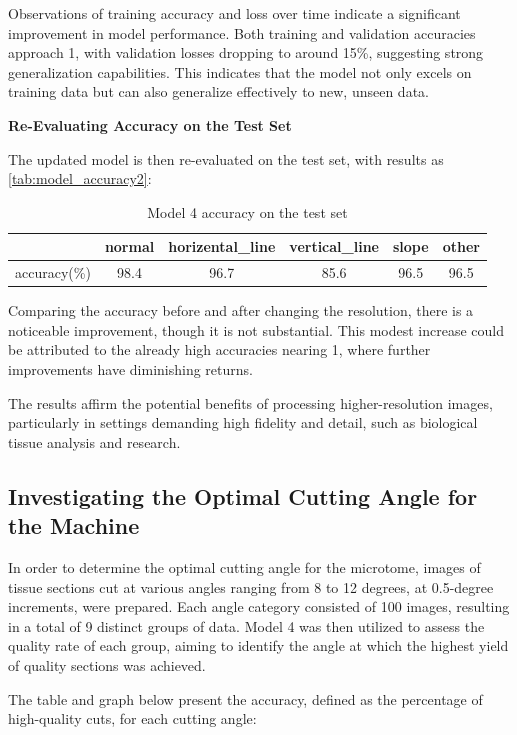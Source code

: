Observations of training accuracy and loss over time indicate a significant improvement in model performance. Both training and validation accuracies approach 1, with validation losses dropping to around 15\%, suggesting strong generalization capabilities. This indicates that the model not only excels on training data but can also generalize effectively to new, unseen data.

\textbf{Re-Evaluating Accuracy on the Test Set}

The updated model is then re-evaluated on the test set, with results as \autoref{tab:model_accuracy2}:

\begin{table}
    \centering
    \caption{Model 4 accuracy on the test set}
    \begin{tabular}{cccccc}
        \toprule
        & normal & horizental\_line & vertical\_line & slope & other \\
        \midrule
        accuracy(\%) & 98.4 & 96.7 & 85.6 & 96.5 & 96.5 \\
        \bottomrule
    \end{tabular}
    \label{tab:model_accuracy2}
    \end{table}

Comparing the accuracy before and after changing the resolution, there is a noticeable improvement, though it is not substantial. This modest increase could be attributed to the already high accuracies nearing 1, where further improvements have diminishing returns.

The results affirm the potential benefits of processing higher-resolution images, particularly in settings demanding high fidelity and detail, such as biological tissue analysis and research.

\subsection{Investigating the Optimal Cutting Angle for the Machine}

In order to determine the optimal cutting angle for the microtome, images of tissue sections cut at various angles ranging from 8 to 12 degrees, at 0.5-degree increments, were prepared. Each angle category consisted of 100 images, resulting in a total of 9 distinct groups of data. Model 4 was then utilized to assess the quality rate of each group, aiming to identify the angle at which the highest yield of quality sections was achieved.

The table and graph below present the accuracy, defined as the percentage of high-quality cuts, for each cutting angle:

